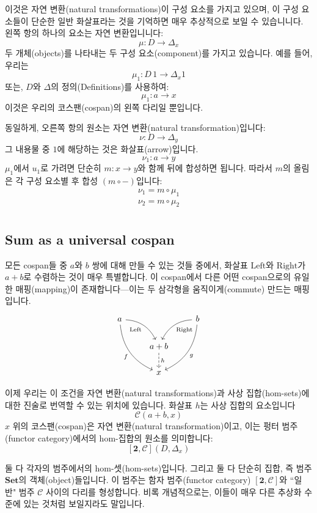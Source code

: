 \documentclass[DaoFP]{subfiles}
\begin{document}
이것은 자연 변환(natural transformations)이 구성 요소를 가지고 있으며, 이 구성 요소들이 단순한 일반 화살표라는 것을 기억하면 매우 추상적으로 보일 수 있습니니다. 왼쪽 항의 하나의 요소는 자연 변환입니니다:
\[ \mu \colon D \to \Delta_x \]
두 개체(objects)를 나타내는 두 구성 요소(component)를 가지고 있습니다. 예를 들어, 우리는
\[ \mu_1 \colon D \, 1 \to \Delta_x 1 \]
또는, $D$와 $\Delta$의 정의(Definitions)를 사용하여:
\[ \mu_1 \colon a \to x \]
이것은 우리의 코스팬(cospan)의 왼쪽 다리일 뿐입니다.

동일하게, 오른쪽 항의 원소는 자연 변환(natural transformation)입니다:
\[ \nu \colon D \to \Delta_{y} \]
그 내용물 중 $1$에 해당하는 것은 화살표(arrow)입니다.
\[ \nu_1 \colon a \to y \]
$\mu_1$에서 $u_1$로 가려면 단순히 $m \colon x \to y$와 함께 뒤에 합성하면 됩니다. 따라서 $m$의 올림은 각 구성 요소별 후 합성 $(m \circ -)$입니다:
\begin{align*}
\nu_1 = m \circ \mu_1 \\
\nu_2 = m \circ \mu_2 \\
\end{align*}

\subsection{Sum as a universal cospan}

모든 cospan들 중 $a$와 $b$ 쌍에 대해 만들 수 있는 것들 중에서, 화살표 $\text{Left}$와 $\text{Right}$가 $a + b$로 수렴하는 것이 매우 특별합니다. 이 cospan에서 다른 어떤 cospan으로의 유일한 매핑(mapping)이 존재합니다---이는 두 삼각형을 움직이게(commute) 만드는 매핑입니다.
\[
 \begin{tikzcd}
 a
 \arrow[dr,  bend left, "\text{Left}"']
 \arrow[ddr, bend right, "f"']
 && b
 \arrow[dl, bend right, "\text{Right}"]
 \arrow[ddl, bend left, "g"]
 \\
&a + b
\arrow[d, dashed, "h"]
\\
& x
 \end{tikzcd}
\]

이제 우리는 이 조건을 자연 변환(natural transformations)과 사상 집합(hom-sets)에 대한 진술로 번역할 수 있는 위치에 있습니다. 화살표 $h$는 사상 집합의 요소입니다
\[ \mathcal{C}(a + b, x)\]
$x$ 위의 코스팬(cospan)은 자연 변환(natural transformation)이고, 이는 펑터 범주(functor category)에서의 hom-집합의 원소를 의미합니다:
\[ [\mathbf{2}, \mathcal{C}](D, \Delta_x) \]

둘 다 각자의 범주에서의 hom-셋(hom-sets)입니다. 그리고 둘 다 단순히 집합, 즉 범주 $\mathbf{Set}$의 객체(object)들입니다. 이 범주는 함자 범주(functor category) $[\mathbf{2}, \mathcal{C}]$와 ``일반" 범주 $\mathcal{C}$ 사이의 다리를 형성합니다. 비록 개념적으로는, 이들이 매우 다른 추상화 수준에 있는 것처럼 보일지라도 말입니다.
\end{document}
